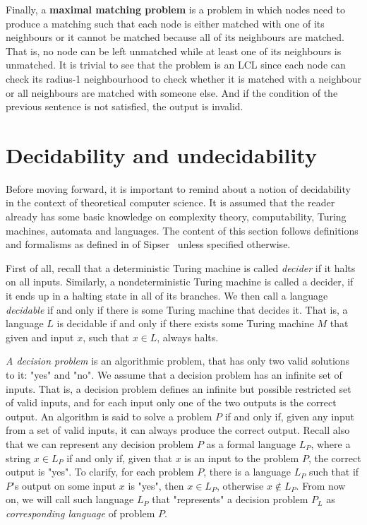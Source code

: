 Finally, a \textbf{maximal matching problem} is a problem in which nodes need to
produce a matching such that each node is either matched with one of 
its neighbours or it cannot be matched because all of its neighbours are
matched. That is, no node can be left unmatched while at least one of its
neighbours is unmatched. It is trivial to see that the problem is an LCL
since each node can check its radius-1 neighbourhood to check whether it
is matched with a neighbour or all neighbours are matched with someone else.
And if the condition of the previous sentence is not satisfied, the output
is invalid.

\section{Decidability and undecidability}

Before moving forward, it is important to remind about a notion of
decidability in the context of theoretical computer science. It is
assumed that the reader already has some basic knowledge on
complexity theory, computability, Turing machines, automata and
languages. The content of this section follows
definitions and formalisms as defined in of Sipser~\cite{Sipser2012}
unless specified otherwise.

First of all, recall that a deterministic Turing machine is called
\emph{decider} if it halts on all inputs. Similarly,
a nondeterministic Turing machine is called a decider, if
it ends up in a halting state in all of its branches. We then
call a language \emph{decidable} if and only if there is some Turing
machine that decides it. That is, a language $L$ is decidable
if and only if there exists some Turing machine $M$ that given
and input $x$, such that $x \in L$, always halts.

\emph{A decision problem} is an algorithmic problem, that has only two
valid solutions to it: "yes" and "no". We assume that a decision
problem has an infinite set of inputs. That is, a decision problem
defines an infinite but possible restricted set of valid inputs,
and for each input only one of the two outputs is the correct
output. An algorithm is said to solve a problem $P$ if and only
if, given any input from a set of valid inputs, it can
always produce the correct output. Recall also that we can
represent any decision problem $P$ as a formal language $L_P$, where
a string $x \in L_P$ if and only if, given that $x$ is an input
to the problem $P$, the correct output is "yes". To clarify,
for each problem $P$, there is a language $L_P$ such that
if $P$'s output on some input $x$ is "yes", then $x \in L_P$,
otherwise $x \notin L_P$. From now on, we will call such
language $L_P$ that "represents" a decision problem $P_L$ as
\emph{corresponding language} of problem $P$.

